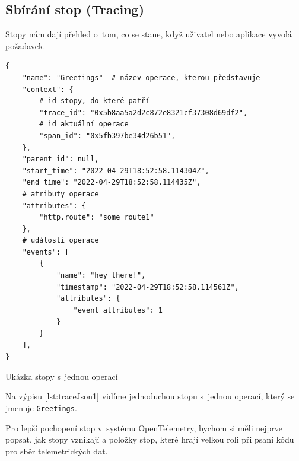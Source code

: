 \subsection{Sbírání stop (Tracing)}
Stopy \cite{Traces} nám dají přehled o~tom, co se stane, když uživatel nebo aplikace vyvolá požadavek.

\begin{listing}[H]
    \begin{verbatim}
{
    "name": "Greetings"  # název operace, kterou představuje
    "context": {
        # id stopy, do které patří 
        "trace_id": "0x5b8aa5a2d2c872e8321cf37308d69df2", 
        # id aktuální operace 
        "span_id": "0x5fb397be34d26b51", 
    },
    "parent_id": null,
    "start_time": "2022-04-29T18:52:58.114304Z",
    "end_time": "2022-04-29T18:52:58.114435Z",
    # atributy operace 
    "attributes": {  
        "http.route": "some_route1"
    },
    # události operace 
    "events": [   
        {
            "name": "hey there!",
            "timestamp": "2022-04-29T18:52:58.114561Z",
            "attributes": {
                "event_attributes": 1
            }
        }
    ],
}
\end{verbatim}
    \caption{Ukázka stopy s~jednou operací}
    \label{lst:traceJson1}
\end{listing}
Na výpisu \ref{lst:traceJson1} vidíme jednoduchou stopu s~jednou operací, který se jmenuje \texttt{Greetings}.

Pro lepší pochopení stop v~systému OpenTelemetry, bychom si měli nejprve popsat, jak stopy vznikají a položky stop, které hrají velkou roli při psaní kódu pro sběr telemetrických dat.

